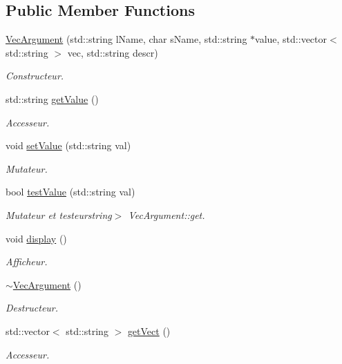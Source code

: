 \subsection*{Public Member Functions}
\begin{DoxyCompactItemize}
\item 
\hyperlink{classVecArgument_aec430730db7a84e0529c4385b60406d7}{Vec\-Argument} (std\-::string l\-Name, char s\-Name, std\-::string $\ast$value, std\-::vector$<$ std\-::string $>$ vec, std\-::string descr)
\begin{DoxyCompactList}\small\item\em Constructeur. \end{DoxyCompactList}\item 
std\-::string \hyperlink{classVecArgument_a45634f1256decb5aed723b9da11db7ad}{get\-Value} ()
\begin{DoxyCompactList}\small\item\em Accesseur. \end{DoxyCompactList}\item 
void \hyperlink{classVecArgument_ab83b7cf9a619de8086743017debee409}{set\-Value} (std\-::string val)
\begin{DoxyCompactList}\small\item\em Mutateur. \end{DoxyCompactList}\item 
bool \hyperlink{classVecArgument_a2b3cbbc68d03d2eec8dd00452d228ef1}{test\-Value} (std\-::string val)
\begin{DoxyCompactList}\small\item\em Mutateur et testeurstring$>$ Vec\-Argument\-::get. \end{DoxyCompactList}\item 
void \hyperlink{classVecArgument_ae3611e8947ccbd26681044f20df4b351}{display} ()
\begin{DoxyCompactList}\small\item\em Afficheur. \end{DoxyCompactList}\item 
\hyperlink{classVecArgument_ae4dbf015d767e2501434c63577f4a30b}{$\sim$\-Vec\-Argument} ()
\begin{DoxyCompactList}\small\item\em Destructeur. \end{DoxyCompactList}\item 
std\-::vector$<$ std\-::string $>$ \hyperlink{classVecArgument_ac9d4c2a47cb82df6a2d3791349c9aa56}{get\-Vect} ()
\begin{DoxyCompactList}\small\item\em Accesseur. \end{DoxyCompactList}\end{DoxyCompactItemize}



